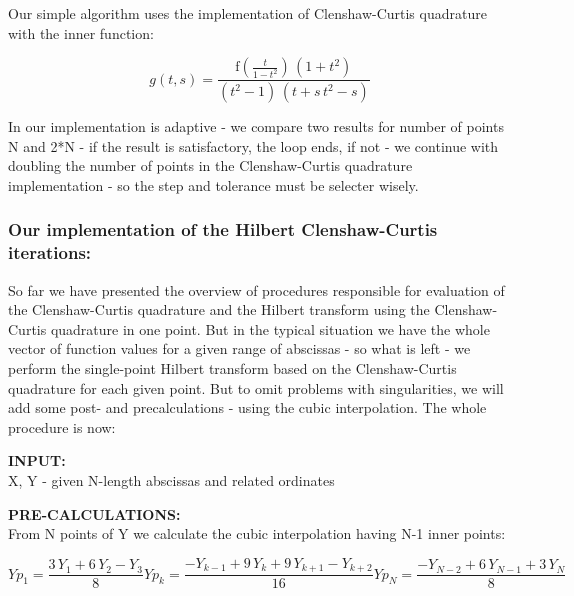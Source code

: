 \documentclass[12pt,twoside,a4paper]{article}
\def\emptyline{\vspace{12pt}}
\numberwithin{equation}{subsection}
\numberwithin{figure}{subsection}
\begin{document}
Our simple algorithm uses the implementation of Clenshaw-Curtis quadrature with the inner function:

\begin{equation} \label{eq:cci_innerfun} 
  g(t,s) = \frac {\mathrm{f}(\frac {t}{1 - t^{2}})\,(1 + t^{2})}{(t^{2} - 1)\,(t + s\,t^{2} - s)}
\end{equation}
 
In our implementation is adaptive - we compare two results for number of points N and 2*N - if the result is satisfactory, the loop
ends, if not - we continue with doubling the number of points in the Clenshaw-Curtis quadrature implementation - so the step and
tolerance must be selecter wisely.

\subsubsection*{Our implementation of the Hilbert Clenshaw-Curtis iterations:}

So far we have presented the overview of procedures responsible for evaluation of the Clenshaw-Curtis quadrature and the Hilbert
transform using the Clenshaw-Curtis quadrature in one point. But in the typical situation we have the whole vector of function
values for a given range of abscissas - so what is left - we perform the single-point Hilbert transform based on the
Clenshaw-Curtis quadrature for each given point. But to omit problems with singularities, we will add some post- and
precalculations - using the cubic interpolation. The whole procedure is now:

\textbf{INPUT:} \\ 
X, Y - given N-length abscissas and related ordinates

\emptyline

\textbf{PRE-CALCULATIONS:} \\
From N points of Y we calculate the cubic interpolation having N-1 inner points:

\begin{subequations} \label{eq:cci_cubicinterpolation}
  \begin{equation}   \label{eq:ccicinterp_first}
    {Yp_{1}}=\frac {3\,{Y_{1}} + 6\,{Y_{2}} - {Y_{3}}}{8}
  \end{equation}
  \begin{equation}   \label{eq:ccicinterp_next}
    {Yp_{k}}=\frac { - {Y_{k - 1}} + 9\,{Y_{k}} + 9\,{Y_{k + 1}} - {Y_{k + 2}}}{16}
  \end{equation}
  \begin{equation}   \label{eq:ccicinterp_last}
    {Yp_{N}}=\frac { - {Y_{N - 2}} + 6\,{Y_{N - 1}} + 3\,{Y_{N}}}{8}
  \end{equation}
\end{subequations}
\end{document}
